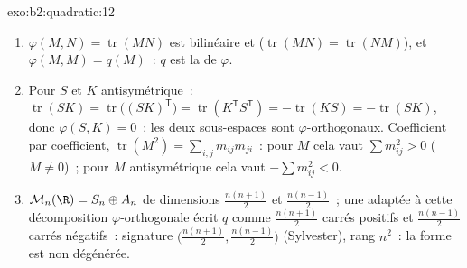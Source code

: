 \begin{solution}{exo:b2:quadratic:12}
\begin{enumerate}
  \item $\varphi(M, N) = \operatorname{tr}(MN)$ est bilinéaire et
         ($\operatorname{tr}(MN) =
        \operatorname{tr}(NM)$), et $\varphi(M, M) = q(M)$~:
        $q$ est la  de $\varphi$.
  \item Pour $S$  et $K$ antisymétrique~:
        $\operatorname{tr}(SK) =
        \operatorname{tr}\bigl((SK)^{\mathsf T}\bigr) =
        \operatorname{tr}(K^{\mathsf T}S^{\mathsf T}) =
        -\operatorname{tr}(KS) = -\operatorname{tr}(SK)$, donc
        $\varphi(S, K) = 0$~: les deux sous-espaces sont
        $\varphi$-orthogonaux. Coefficient par coefficient,
        $\operatorname{tr} (M^2) = \sum_{i,j} m_{ij}m_{ji}$~: pour
        $M$  cela vaut $\sum m_{ij}^2 > 0$ ($M \neq 0$)~;
        pour $M$ antisymétrique cela vaut $-\sum m_{ij}^2 < 0$.
  \item $\mathcal M_n(\R) = S_n \oplus A_n$ de dimensions
        $\frac{n(n+1)}2$ et $\frac{n(n-1)}2$~; une  adaptée à cette décomposition $\varphi$-orthogonale
        écrit $q$ comme $\frac{n(n+1)}2$ carrés positifs et
        $\frac{n(n-1)}2$ carrés négatifs~: signature
        $\bigl(\frac{n(n+1)}2, \frac{n(n-1)}2\bigr)$
        (Sylvester), rang $n^2$~: la forme est non dégénérée.
\end{enumerate}
\end{solution}


